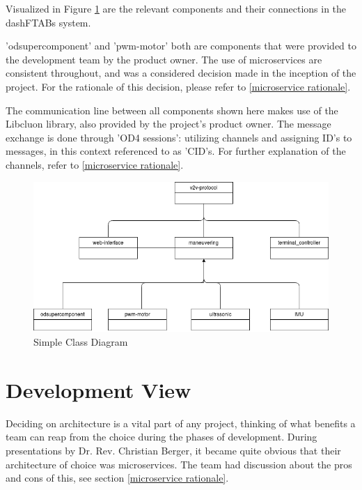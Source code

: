 \documentclass[12pt]{article}
\begin{document}
Visualized in Figure \ref{fig:classDiagramLogigal} are the relevant components and their connections in the dashFTABs system. 

'odsupercomponent' and 'pwm-motor' both are components that were provided to the development team by the product owner. The use of microservices are consistent throughout, and was a considered decision made in the inception of the project. For the rationale of this decision, please refer to \ref{microservice rationale}.

The communication line between all components shown here makes use of the Libcluon library, also provided by the project's product owner. The message exchange is done through 'OD4 sessions': utilizing channels and assigning ID's to messages, in this context referenced to as 'CID's. For further explanation of the channels, refer to \ref{microservice rationale}.
\FloatBarrier %
\begin{figure}[h]
\centering
\includegraphics[width=\linewidth]{Diagrams/logical_view.png}
\caption{Simple Class Diagram}
\label{fig:classDiagramLogigal}
\end{figure}
\FloatBarrier %

\pagebreak

\section{Development View}
Deciding on architecture is a vital part of any project, thinking of what benefits a team can reap from the choice during the phases of development. During presentations by Dr. Rev. Christian Berger, it became quite obvious that their architecture of choice was microservices. The team had discussion about the pros and cons of this, see section \ref{microservice rationale}. 
\end{document}
